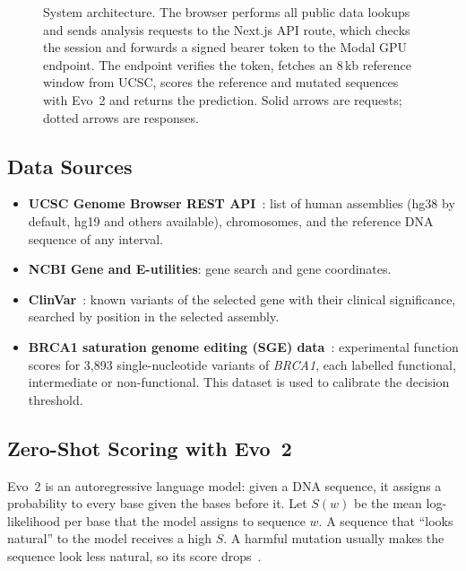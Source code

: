 \documentclass[conference,a4paper]{IEEEtran}
\begin{document}
\begin{figure}[!t]
\caption{System architecture. The browser performs all public data lookups and sends analysis requests to the Next.js API route, which checks the session and forwards a signed bearer token to the Modal GPU endpoint. The endpoint verifies the token, fetches an 8\,kb reference window from UCSC, scores the reference and mutated sequences with Evo~2 and returns the prediction. Solid arrows are requests; dotted arrows are responses.}
\label{fig:arch}
\end{figure}

\subsection{Data Sources}
\begin{itemize}
\item \textbf{UCSC Genome Browser REST API}~\cite{lee2022ucsc}: list of human assemblies (hg38 by default, hg19 and others available), chromosomes, and the reference DNA sequence of any interval.
\item \textbf{NCBI Gene and E-utilities}: gene search and gene coordinates.
\item \textbf{ClinVar}~\cite{landrum2024clinvar}: known variants of the selected gene with their clinical significance, searched by position in the selected assembly.
\item \textbf{BRCA1 saturation genome editing (SGE) data}~\cite{findlay2018brca1}: experimental function scores for 3{,}893 single-nucleotide variants of \emph{BRCA1}, each labelled functional, intermediate or non-functional. This dataset is used to calibrate the decision threshold.
\end{itemize}

\subsection{Zero-Shot Scoring with Evo~2}
Evo~2 is an autoregressive language model: given a DNA sequence, it assigns a probability to every base given the bases before it. Let $S(w)$ be the mean log-likelihood per base that the model assigns to sequence $w$. A sequence that ``looks natural'' to the model receives a high $S$. A harmful mutation usually makes the sequence look less natural, so its score drops~\cite{brixi2026evo2}.
\end{document}
